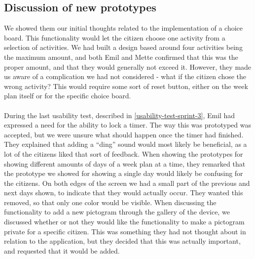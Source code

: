 \subsection{Discussion of new prototypes}
We showed them our initial thoughts related to the implementation of a choice board.
This functionality would let the citizen choose one activity from a selection of activities.
We had built a design based around four activities being the maximum amount, and both Emil and Mette confirmed that this was the proper amount, and that they would generally not exceed it. 
However, they made us aware of a complication we had not considered - what if the citizen chose the wrong activity?
This would require some sort of reset button, either on the week plan itself or for the specific choice board.
\\\\
During the last usability test, described in \autoref{usability-test-sprint-3}, Emil had expressed a need for the ability to lock a timer.
The way this was prototyped was accepted, but we were unsure what should happen once the timer had finished.
They explained that adding a “ding” sound would most likely be beneficial, as a lot of the citizens liked that sort of feedback.
When showing the prototypes for showing different amounts of days of a week plan at a time, they remarked that the prototype we showed for showing a single day would likely be confusing for the citizens.
On both edges of the screen we had a small part of the previous and next days shown, to indicate that they would actually occur.
They wanted this removed, so that only one color would be visible.
When discussing the functionality to add a new pictogram through the gallery of the device, we discussed whether or not they would like the functionality to make a pictogram private for a specific citizen.
This was something they had not thought about in relation to the application, but they decided that this was actually important, and requested that it would be added.

 	          
